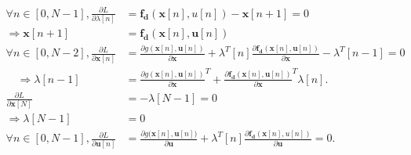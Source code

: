  \begin{align} \forall n\in[0,N-1], \frac{\partial {L}}{\partial{\lambda[n]}} &= \mathbf{f_d}(\mathbf x[n], u[n]) - \mathbf x[n+1] = 0 \nonumber \\ \Rightarrow \mathbf x[n+1] &= \mathbf{f_d}(\mathbf x[n], \mathbf u[n])  \label{eq:dynamic_eq}
 \\
    \forall n\in[0,N-2], \frac{\partial{L}}{\partial \mathbf x[n]} &= \frac{\partial{g(\mathbf x[n],\mathbf u[n])}}{\partial \mathbf x} + \lambda^T[n] \frac{\partial{\mathbf{f_d}(\mathbf x[n],\mathbf u[n])}}{\partial \mathbf x} - \lambda^T[n-1] = 0 \nonumber \\
    \quad \Rightarrow \lambda[n-1] &= \frac{\partial{g(\mathbf x[n],\mathbf u[n])}}{\partial \mathbf x}^T + \frac{\partial{\mathbf{f_d}(\mathbf x[n],\mathbf u[n])}}{\partial \mathbf x}^T \lambda[n]. \label{eq:lambda_i}\\
    \frac{\partial{L}}{\partial \mathbf x[N]} &= -\lambda[N-1] = 0 \nonumber \\ \Rightarrow \lambda[N-1] &= 0 \label{eq:lambda_N}\\
    \forall n\in[0,N-1], \frac{\partial{L}}{\partial \mathbf u[n]} &= \frac{\partial{g(\mathbf x[n]}, \mathbf u[n])}{\partial \mathbf u} + \lambda^T[n] \frac{\partial{\mathbf{f_d}(\mathbf x[n], u[n])}}{\partial \mathbf u} = 0. \label{eq:dldu}
  \end{align}
  
